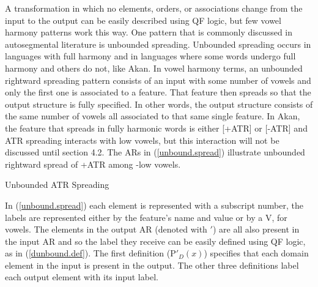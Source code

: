 \documentclass[,doc,floatsintext]{apa6}
\theoremstyle{definition}
\theoremstyle{definition}
\theoremstyle{definition}
\theoremstyle{remark}
\begin{document}
A transformation in which no elements, orders, or associations change
from the input to the output can be easily described using QF logic, but
few vowel harmony patterns work this way. One pattern that is commonly
discussed in autosegmental literature is unbounded spreading. Unbounded
spreading occurs in languages with full harmony and in languages where
some words undergo full harmony and others do not, like Akan. In vowel
harmony terms, an unbounded rightward spreading pattern consists of an
input with some number of vowels and only the first one is associated to
a feature. That feature then spreads so that the output structure is
fully specified. In other words, the output structure consists of the
same number of vowels all associated to that same single feature. In
Akan, the feature that spreads in fully harmonic words is either
{[}+ATR{]} or {[}-ATR{]} and ATR spreading interacts with low vowels,
but this interaction will not be discussed until section 4.2. The ARs in
(\ref{unbound.spread}) illustrate unbounded rightward spread of +ATR
among -low vowels.

\begin{exe}
\ex \label{unbound.spread} Unbounded ATR Spreading \\
\end{exe}

In (\ref{unbound.spread}) each element is represented with a subscript
number, the labels are represented either by the feature's name and
value or by a V, for vowels. The elements in the output AR (denoted with
\('\)) are all also present in the input AR and so the label they
receive can be easily defined using QF logic, as in
(\ref{dunbound.def}). The first definition (P\('_{D}(x)\)) specifies
that each domain element in the input is present in the output. The
other three definitions label each output element with its input label.
\end{document}
